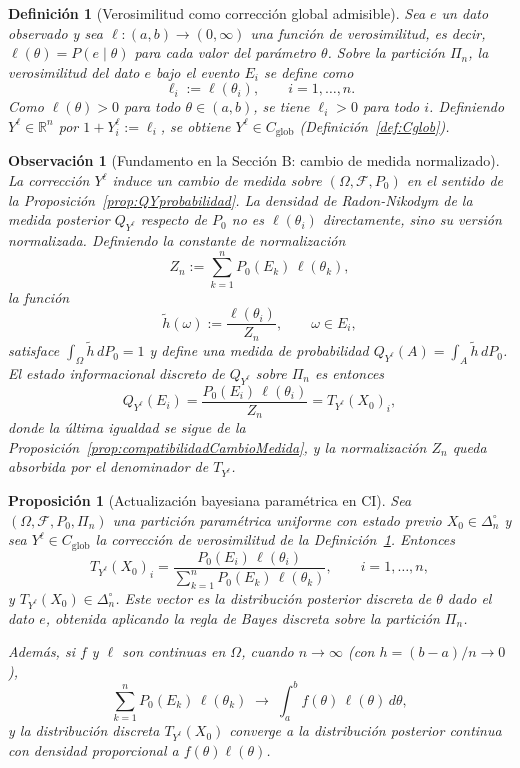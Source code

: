 ﻿\documentclass[12pt]{article}
\newtheorem{definicion}{Definición}[section]
\newtheorem{proposicion}{Proposición}[section]
\newtheorem{observacion}{Observación}[section]
\begin{document}
\begin{definicion}[Verosimilitud como corrección global admisible]\label{def:verosimilitud_global}
Sea $e$ un dato observado y sea $\ell:(a,b)\to(0,\infty)$ una función de verosimilitud, es decir, $\ell(\theta) = P(e\mid \theta)$ para cada valor del parámetro $\theta$. Sobre la partición $\Pi_n$, la verosimilitud del dato $e$ bajo el evento $E_i$ se define como
\[
\ell_i := \ell(\theta_i),
\qquad i=1,\dots,n.
\]
Como $\ell(\theta)>0$ para todo $\theta\in(a,b)$, se tiene $\ell_i>0$ para todo $i$. Definiendo $Y^\ell \in \mathbb{R}^n$ por $1+Y^\ell_i := \ell_i$, se obtiene $Y^\ell \in C_{\mathrm{glob}}$ (Definición~\ref{def:Cglob}).
\end{definicion}

\begin{observacion}[Fundamento en la Sección B: cambio de medida normalizado]\label{obs:verosimilitud_cambio_medida}
La corrección $Y^\ell$ induce un cambio de medida sobre $(\Omega,\mathcal{F},P_0)$ en el sentido de la Proposición~\ref{prop:QYprobabilidad}. La densidad de Radon-Nikodym de la medida posterior $Q_{Y^\ell}$ respecto de $P_0$ no es $\ell(\theta_i)$ directamente, sino su versión normalizada. Definiendo la constante de normalización
\[
Z_n := \sum_{k=1}^n P_0(E_k)\,\ell(\theta_k),
\]
la función
\[
\widetilde h(\omega) := \frac{\ell(\theta_i)}{Z_n}, \qquad \omega\in E_i,
\]
satisface $\int_\Omega \widetilde h\,dP_0 = 1$ y define una medida de probabilidad $Q_{Y^\ell}(A) = \int_A \widetilde h\,dP_0$. El estado informacional discreto de $Q_{Y^\ell}$ sobre $\Pi_n$ es entonces
\[
Q_{Y^\ell}(E_i) = \frac{P_0(E_i)\,\ell(\theta_i)}{Z_n} = T_{Y^\ell}(X_0)_i,
\]
donde la última igualdad se sigue de la Proposición~\ref{prop:compatibilidadCambioMedida}, y la normalización $Z_n$ queda absorbida por el denominador de $T_{Y^\ell}$.
\end{observacion}

\begin{proposicion}[Actualización bayesiana paramétrica en CI]\label{prop:bayes_parametrico}
Sea $(\Omega,\mathcal{F},P_0,\Pi_n)$ una partición paramétrica uniforme con estado previo $X_0\in\Delta_n^\circ$ y sea $Y^\ell\in C_{\mathrm{glob}}$ la corrección de verosimilitud de la Definición~\ref{def:verosimilitud_global}. Entonces
\[
T_{Y^\ell}(X_0)_i
= \frac{P_0(E_i)\,\ell(\theta_i)}{\displaystyle\sum_{k=1}^n P_0(E_k)\,\ell(\theta_k)},
\qquad i=1,\dots,n,
\]
y $T_{Y^\ell}(X_0)\in\Delta_n^\circ$. Este vector es la distribución posterior discreta de $\theta$ dado el dato $e$, obtenida aplicando la regla de Bayes discreta sobre la partición $\Pi_n$.

Además, si $f$ y $\ell$ son continuas en $\Omega$, cuando $n\to\infty$ (con $h=(b-a)/n\to 0$),
\[
\sum_{k=1}^n P_0(E_k)\,\ell(\theta_k)
\;\longrightarrow\;
\int_a^b f(\theta)\,\ell(\theta)\,d\theta,
\]
y la distribución discreta $T_{Y^\ell}(X_0)$ converge a la distribución posterior continua con densidad proporcional a $f(\theta)\ell(\theta)$.
\end{proposicion}
\end{document}
